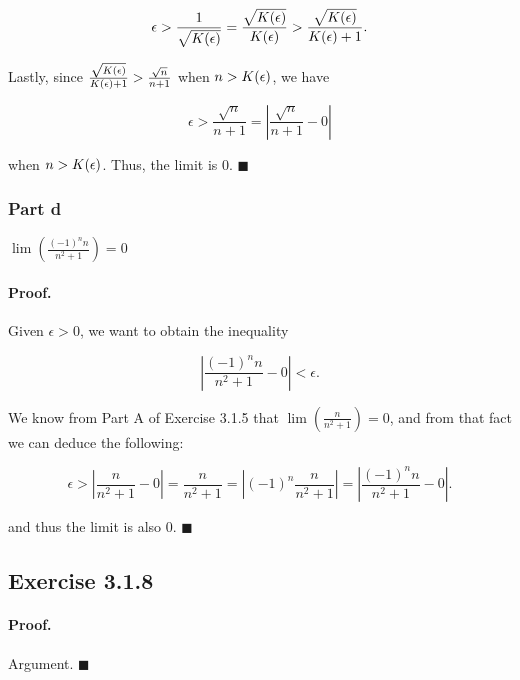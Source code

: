 \documentclass[paper=a4, fontsize=11pt]{scrartcl} %
\numberwithin{equation}{section} %
\numberwithin{figure}{section} %
\numberwithin{table}{section} %
\begin{document}
\begin{equation*}
\epsilon > \frac{1}{\sqrt{K(\epsilon)}} = \frac{\sqrt{K(\epsilon)}}{K(\epsilon)} > \frac{\sqrt{K(\epsilon)}}{K(\epsilon) + 1}.
\end{equation*}

Lastly, since $\frac{\sqrt{K(\epsilon)}}{K(\epsilon) + 1} > \frac{\sqrt{n}}{n + 1}$ when $n > K(\epsilon)$, we have

\begin{equation*}
\epsilon > \frac{\sqrt{n}}{n + 1} = \left|\frac{\sqrt{n}}{n + 1} - 0\right|
\end{equation*}

when $n > K(\epsilon)$. Thus, the limit is 0. $\blacksquare$\\
\subsubsection*{Part d}

$\lim\left(\frac{(-1)^n n}{n^2 + 1}\right) = 0$

\paragraph{Proof.} Given $\epsilon > 0$, we want to obtain the inequality 

\begin{equation*}
\left|\frac{(-1)^n n}{n^2 + 1} - 0\right| < \epsilon.
\end{equation*}

We know from Part A of Exercise 3.1.5 that $\lim\left(\frac{n}{n^2 + 1}\right) = 0$, and from that fact we can deduce the following:

\begin{equation*}
\epsilon > \left|\frac{n}{n^2 + 1} - 0\right| = \frac{n}{n^2 + 1} = \left|(-1)^n \frac{n}{n^2 + 1}\right| = \left|\frac{(-1)^n n}{n^2 + 1} - 0\right|.
\end{equation*}

and thus the limit is also 0. $\blacksquare$\\

\subsection*{Exercise 3.1.8}
\paragraph{Proof.} Argument. $\blacksquare$\\
\end{document}
